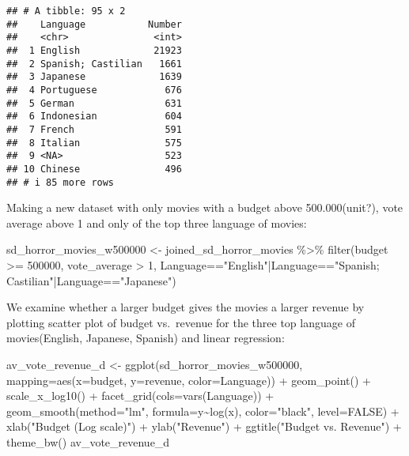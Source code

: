 \documentclass[
]{article}
\newenvironment{Shaded}{\begin{snugshade}}{\end{snugshade}}
\newcommand{\AttributeTok}[1]{\textcolor[rgb]{0.77,0.63,0.00}{#1}}
\newcommand{\ConstantTok}[1]{\textcolor[rgb]{0.00,0.00,0.00}{#1}}
\newcommand{\DecValTok}[1]{\textcolor[rgb]{0.00,0.00,0.81}{#1}}
\newcommand{\FunctionTok}[1]{\textcolor[rgb]{0.00,0.00,0.00}{#1}}
\newcommand{\NormalTok}[1]{#1}
\newcommand{\OtherTok}[1]{\textcolor[rgb]{0.56,0.35,0.01}{#1}}
\newcommand{\SpecialCharTok}[1]{\textcolor[rgb]{0.00,0.00,0.00}{#1}}
\newcommand{\StringTok}[1]{\textcolor[rgb]{0.31,0.60,0.02}{#1}}
\begin{document}
\begin{verbatim}
## # A tibble: 95 x 2
##    Language           Number
##    <chr>               <int>
##  1 English             21923
##  2 Spanish; Castilian   1661
##  3 Japanese             1639
##  4 Portuguese            676
##  5 German                631
##  6 Indonesian            604
##  7 French                591
##  8 Italian               575
##  9 <NA>                  523
## 10 Chinese               496
## # i 85 more rows
\end{verbatim}

Making a new dataset with only movies with a budget above
500.000(unit?), vote average above 1 and only of the top three language
of movies:

\begin{Shaded}
\begin{Highlighting}[]
\NormalTok{sd\_horror\_movies\_w500000 }\OtherTok{\textless{}{-}}\NormalTok{ joined\_sd\_horror\_movies }\SpecialCharTok{\%\textgreater{}\%} \FunctionTok{filter}\NormalTok{(budget }\SpecialCharTok{\textgreater{}=} \DecValTok{500000}\NormalTok{, vote\_average }\SpecialCharTok{\textgreater{}} \DecValTok{1}\NormalTok{, Language}\SpecialCharTok{==}\StringTok{"English"}\SpecialCharTok{|}\NormalTok{Language}\SpecialCharTok{==}\StringTok{"Spanish; Castilian"}\SpecialCharTok{|}\NormalTok{Language}\SpecialCharTok{==}\StringTok{"Japanese"}\NormalTok{)}
\end{Highlighting}
\end{Shaded}

We examine whether a larger budget gives the movies a larger revenue by
plotting scatter plot of budget vs.~revenue for the three top language
of movies(English, Japanese, Spanish) and linear regression:

\begin{Shaded}
\begin{Highlighting}[]
\NormalTok{av\_vote\_revenue\_d }\OtherTok{\textless{}{-}} \FunctionTok{ggplot}\NormalTok{(sd\_horror\_movies\_w500000, }\AttributeTok{mapping=}\FunctionTok{aes}\NormalTok{(}\AttributeTok{x=}\NormalTok{budget, }\AttributeTok{y=}\NormalTok{revenue, }\AttributeTok{color=}\NormalTok{Language)) }\SpecialCharTok{+} \FunctionTok{geom\_point}\NormalTok{() }\SpecialCharTok{+} \FunctionTok{scale\_x\_log10}\NormalTok{() }\SpecialCharTok{+} \FunctionTok{facet\_grid}\NormalTok{(}\AttributeTok{cols=}\FunctionTok{vars}\NormalTok{(Language)) }\SpecialCharTok{+} \FunctionTok{geom\_smooth}\NormalTok{(}\AttributeTok{method=}\StringTok{"lm"}\NormalTok{, }\AttributeTok{formula=}\NormalTok{y}\SpecialCharTok{\textasciitilde{}}\FunctionTok{log}\NormalTok{(x), }\AttributeTok{color=}\StringTok{"black"}\NormalTok{, }\AttributeTok{level=}\ConstantTok{FALSE}\NormalTok{) }\SpecialCharTok{+} \FunctionTok{xlab}\NormalTok{(}\StringTok{"Budget (Log scale)"}\NormalTok{) }\SpecialCharTok{+} \FunctionTok{ylab}\NormalTok{(}\StringTok{"Revenue"}\NormalTok{) }\SpecialCharTok{+} \FunctionTok{ggtitle}\NormalTok{(}\StringTok{"Budget vs. Revenue"}\NormalTok{) }\SpecialCharTok{+} \FunctionTok{theme\_bw}\NormalTok{() }
\NormalTok{av\_vote\_revenue\_d }
\end{Highlighting}
\end{Shaded}
\end{document}
